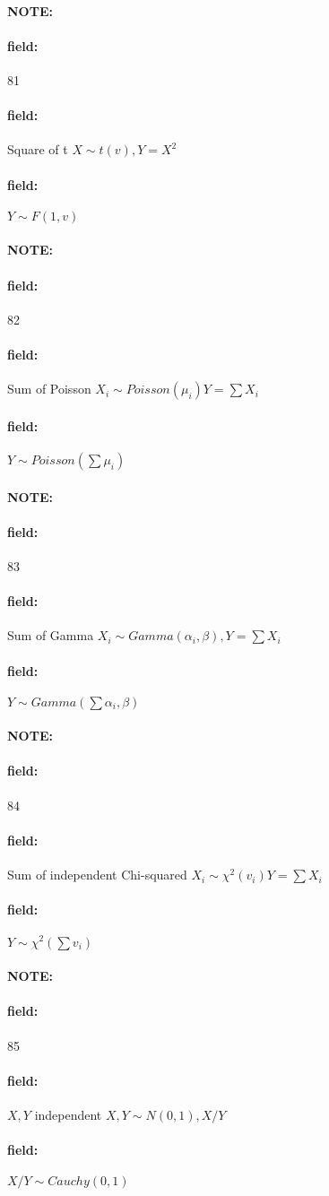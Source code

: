 \documentclass[12pt]{article}
\newenvironment{note}{\paragraph{NOTE:}}{}
\newenvironment{field}{\paragraph{field:}}{}
\begin{document}
\begin{note} \begin{field} \tiny 81 \end{field}
  \begin{field}
    Square of t
    $X \sim t(v), Y = X^2$
  \end{field}
  \begin{field}
    $Y \sim F(1,v)$
  \end{field}
\end{note}

\begin{note} \begin{field} \tiny 82 \end{field}
  \begin{field}
    Sum of Poisson
    $X_i \sim Poisson(\mu_i) Y = \sum X_i$
  \end{field}
  \begin{field}
    $Y \sim Poisson(\sum \mu_i)$
  \end{field}
\end{note}

\begin{note} \begin{field} \tiny 83 \end{field}
  \begin{field}
    Sum of Gamma
    $X_i \sim Gamma(\alpha_i, \beta), Y = \sum X_i$
  \end{field}
  \begin{field}
    $Y \sim Gamma(\sum \alpha_i, \beta)$
  \end{field}
\end{note}

\begin{note} \begin{field} \tiny 84 \end{field}
  \begin{field}
    Sum of independent Chi-squared
    $ X_i \sim \chi^2(v_i) Y = \sum X_i$
  \end{field}
  \begin{field}
    $Y \sim \chi^2(\sum v_i)$
  \end{field}
\end{note}


\begin{note} \begin{field} \tiny 85 \end{field}
  \begin{field}
    $X,Y$ independent
    $X,Y \sim N(0,1), X/Y$
  \end{field}
  \begin{field}
    $X/Y \sim Cauchy(0,1)$
  \end{field}
\end{note}
\end{document}

